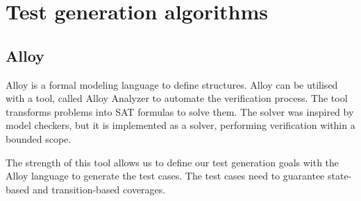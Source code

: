 
\section{Test generation algorithms}
\label{sec:testgenerationalgorithms}

\subsection{Alloy}
\label{sub:alloy}

Alloy is a formal modeling language to define structures. Alloy can be utilised with a tool, called Alloy Analyzer to automate the verification process. The tool transforms problems into SAT formulas to solve them. The solver was inspired by model checkers, but it is implemented as a solver, performing verification within a bounded scope.

The strength of this tool allows us to define our test generation goals with the Alloy language to generate the test cases. The test cases need to guarantee state-based and transition-based coverages.



